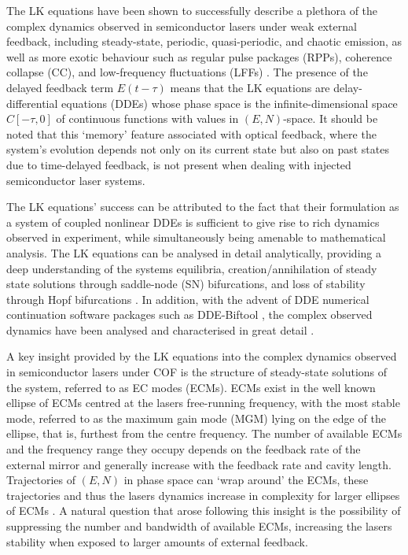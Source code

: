 %
The LK equations have been shown to successfully describe a plethora of the complex dynamics observed in semiconductor lasers under weak external feedback, including steady-state, periodic, quasi-periodic, and chaotic emission, 
as well as more exotic behaviour such as regular pulse packages (RPPs), coherence collapse (CC), and low-frequency fluctuations (LFFs) \cite{heil1998coexistence}. 
The presence of the delayed feedback term $E(t-\tau)$ means that the LK equations are delay-differential equations (DDEs) whose phase space is the infinite-dimensional space $C[-\tau, 0]$ of continuous functions with values in $(E,N)$-space. 
It should be noted that this `memory' feature associated with optical feedback, where the system's evolution depends not only on its current state but also on past states due to time-delayed feedback, 
is not present when dealing with injected semiconductor laser systems.
%
\par
%
The LK equations' success can be attributed to the fact that their formulation as a system of coupled nonlinear DDEs is sufficient to give rise to rich dynamics observed in experiment, while simultaneously being amenable to mathematical analysis. 
The LK equations can be analysed in detail analytically, providing a deep understanding of the systems equilibria, creation/annihilation of steady state solutions through saddle-node (SN) bifurcations, 
and loss of stability through Hopf bifurcations \cite{rottschafer2007ecm}. 
In addition, with the advent of DDE numerical continuation software packages such as DDE-Biftool \cite{sieber2014dde}, the complex observed dynamics have been analysed and characterised in great detail \cite{krauskopf2004dynamics}.
%
\par
%
A key insight provided by the LK equations into the complex dynamics observed in semiconductor lasers under COF is the structure of steady-state solutions of the system, referred to as EC modes (ECMs). 
ECMs exist in the well known ellipse of ECMs centred at the lasers free-running frequency, with the most stable mode, referred to as the maximum gain mode (MGM) lying on the edge of the ellipse, that is, furthest from the centre frequency. 
The number of available ECMs and the frequency range they occupy depends on the feedback rate of the external mirror and generally increase with the feedback rate and cavity length. 
Trajectories of $(E,N)$ in phase space can `wrap around' the ECMs, these trajectories and thus the lasers dynamics increase in complexity for larger ellipses of ECMs \cite{heil2003delay}. 
A natural question that arose following this insight is the possibility of suppressing the number and bandwidth of available ECMs, increasing the lasers stability when exposed to larger amounts of external feedback.
%
%
